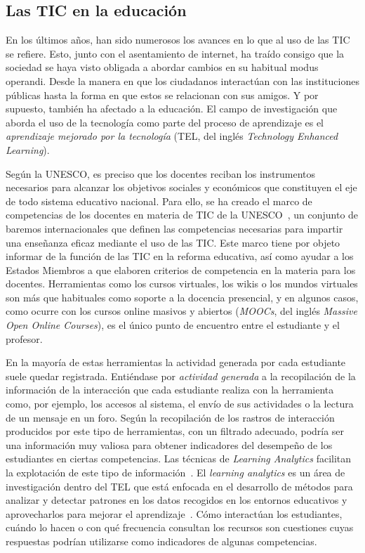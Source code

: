 \subsection*{Las TIC en la educación}

En los últimos años, han sido numerosos los avances en lo que al uso de las TIC se refiere. Esto, junto con el asentamiento de internet, ha traído consigo que la sociedad se haya visto obligada a abordar cambios en su habitual modus operandi. Desde la manera en que los ciudadanos interactúan con las instituciones públicas hasta la forma en que estos se relacionan con sus amigos. Y por supuesto, también ha afectado a la educación. El campo de investigación que aborda el uso de la tecnología como parte del proceso de aprendizaje es el \emph{aprendizaje mejorado por la tecnología} (TEL, del inglés \emph{Technology Enhanced Learning}).

Según la UNESCO, es preciso que los docentes reciban los instrumentos necesarios para alcanzar los objetivos sociales y económicos que constituyen el eje de todo sistema educativo nacional. Para ello, se ha creado el marco de competencias de los docentes en materia de TIC de la UNESCO~\cite{midoro2013guidelines}, un conjunto de baremos internacionales que definen las competencias necesarias para impartir una enseñanza eficaz mediante el uso de las TIC. Este marco tiene por objeto informar de la función de las TIC en la reforma educativa, así como ayudar a los Estados Miembros a que elaboren criterios de competencia en la materia para los docentes. Herramientas como los cursos virtuales, los wikis o los mundos virtuales son más que habituales como soporte a la docencia presencial, y en algunos casos, como ocurre con los cursos online masivos y abiertos (\emph{MOOCs}, del inglés \emph{Massive Open Online Courses}), es el único punto de encuentro entre el estudiante y el profesor.

En la mayoría de estas herramientas la actividad generada por cada estudiante suele quedar registrada. Entiéndase por \emph{actividad generada} a la recopilación de la información de la interacción que cada estudiante realiza con la herramienta como, por ejemplo, los accesos al sistema, el envío de sus actividades o la lectura de un mensaje en un foro. Según \cite{Chebil:2012, Florian:2011} la recopilación de los rastros de interacción producidos por este tipo de herramientas, con un filtrado adecuado, podría ser una información muy valiosa para obtener indicadores del desempeño de los estudiantes en ciertas competencias. Las técnicas de \emph{Learning Analytics} facilitan la explotación de este tipo de información~\cite{conde2015exploring}. El \emph{learning analytics} es un área de investigación dentro del TEL que está enfocada en el desarrollo de métodos para analizar y detectar patrones en los datos recogidos en los entornos educativos y aprovecharlos para mejorar el aprendizaje~\cite{chatti2014learning}.  Cómo interactúan los estudiantes, cuándo lo hacen o con qué frecuencia consultan los recursos son cuestiones cuyas respuestas podrían utilizarse como indicadores de algunas competencias. 


